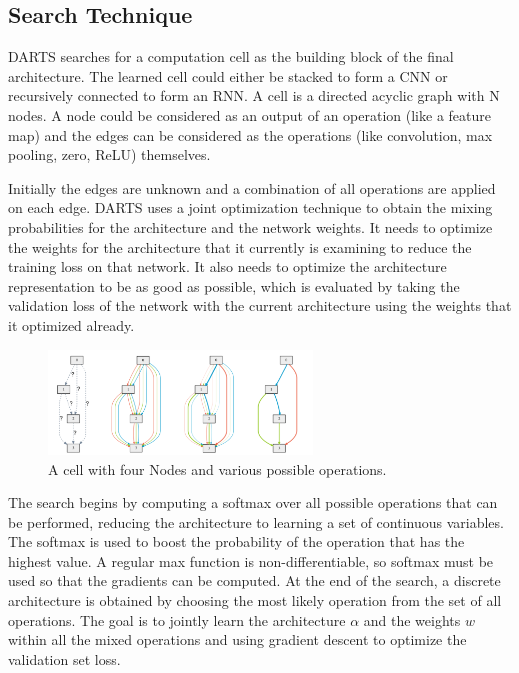 \documentclass{ieee}
\begin{document}
\subsection{Search Technique}
DARTS searches for a computation cell as the building block of the final architecture. The learned cell could either be stacked to form a CNN or recursively connected to form an RNN. A cell is a directed acyclic graph with N nodes. A node could be considered as an output of an operation (like a feature map) and the edges can be considered as the operations (like convolution, max pooling, zero, ReLU) themselves. 

Initially the edges are unknown and a combination of all operations are applied on each edge. DARTS uses a joint optimization technique to obtain the mixing probabilities for the architecture and the network weights. It needs to optimize the weights for the architecture that it currently is examining to reduce the training loss on that network. It also needs to optimize the architecture representation to be as good as possible, which is evaluated by taking the validation loss of the network with the current architecture using the weights that it optimized already. 
 \begin{figure}[h]
    \begin{center}
    \includegraphics[width=7cm]{images/DARTS.png}
    \end{center}
    \label{mbconv_fig}
    \caption{A cell with four Nodes and various possible operations. \cite{DARTSMODEL}}
\end{figure}

The search begins by computing a softmax over all possible operations that can be performed, reducing the architecture to learning a set of continuous variables. The softmax is used to boost the probability of the operation that has the highest value. A regular max function is non-differentiable, so softmax must be used so that the gradients can be computed. At the end of the search, a discrete architecture is obtained by choosing the most likely operation from the set of all operations. The goal is to jointly learn the architecture $\alpha$ and the weights $w$ within all the mixed operations and using gradient descent to optimize the validation set loss.
\end{document}
